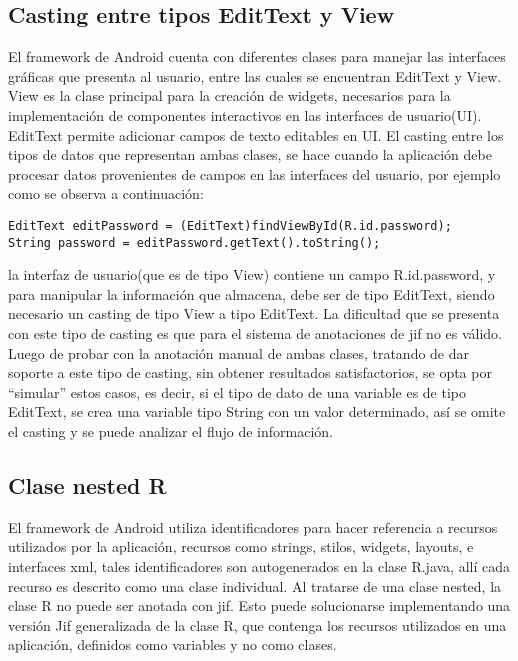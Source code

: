 \subsection{Casting entre tipos EditText y View}
\label{sec:casting}
El framework de Android cuenta con diferentes clases para manejar las interfaces
gráficas que presenta al usuario, entre las cuales se encuentran EditText y
View.\newline
View es la clase principal para la creación de widgets, necesarios para la
implementación de componentes interactivos en las interfaces de
usuario(UI).\newline 
EditText permite adicionar campos de texto editables en UI.\newline
El casting entre los tipos de datos que representan ambas clases, se hace cuando la aplicación debe
procesar datos provenientes de campos en las interfaces del usuario, por ejemplo
como se observa a continuación:
\begin{lstlisting}
EditText editPassword = (EditText)findViewById(R.id.password);
String password = editPassword.getText().toString();
\end{lstlisting}
la interfaz de usuario(que es de tipo View) contiene un campo R.id.password, y
para manipular la información que almacena, debe ser de tipo EditText, siendo
necesario un casting de tipo View a tipo EditText. La dificultad que se presenta
con este tipo de casting es que para el sistema de anotaciones de jif no es
válido. Luego de probar con la anotación manual de ambas clases, tratando de
dar soporte a este tipo de casting, sin obtener resultados satisfactorios, se
opta por ``simular'' estos casos, es decir, si el tipo de dato de una variable
es de tipo EditText, se crea una variable tipo String con un valor determinado,
así se omite el casting y se puede analizar el flujo de información.

\subsection{Clase nested R}
\label{sec:nested}
El framework de Android utiliza identificadores para hacer referencia a recursos
utilizados por la aplicación, recursos como strings, stilos, widgets, layouts, e
interfaces xml, tales identificadores son autogenerados en la clase R.java, allí
cada recurso es descrito como una clase individual. Al tratarse de una clase
nested, la clase R no puede ser anotada con jif. Esto puede solucionarse
implementando una versión Jif generalizada de la clase R, que contenga los
recursos utilizados en una aplicación, definidos como variables y no como clases.

